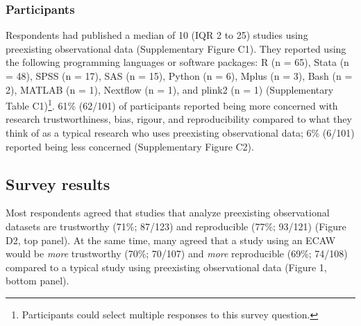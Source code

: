 \documentclass[
  man,floatsintext]{apa6}
\begin{document}
\hypertarget{participants-2}{%
\subsubsection{Participants}\label{participants-2}}

Respondents had published a median of 10 (IQR 2 to 25) studies using preexisting observational data (Supplementary Figure C1). They reported using the following programming languages or software packages: R (n = 65), Stata (n = 48), SPSS (n = 17), SAS (n = 15), Python (n = 6), Mplus (n = 3), Bash (n = 2), MATLAB (n = 1), Nextflow (n = 1), and plink2 (n = 1) (Supplementary Table C1)\footnote[1]{Participants could select multiple responses to this survey question.}. 61\% (62/101) of participants reported being more concerned with research trustworthiness, bias, rigour, and reproducibility compared to what they think of as a typical research who uses preexisting observational data; 6\% (6/101) reported being less concerned (Supplementary Figure C2).

\hypertarget{survey-results-1}{%
\subsection{Survey results}\label{survey-results-1}}

Most respondents agreed that studies that analyze preexisting observational datasets are trustworthy (71\%; 87/123) and reproducible (77\%; 93/121) (Figure D2, top panel). At the same time, many agreed that a study using an ECAW would be \emph{more} trustworthy (70\%; 70/107) and \emph{more} reproducible (69\%; 74/108) compared to a typical study using preexisting observational data (Figure 1, bottom panel).
\end{document}
